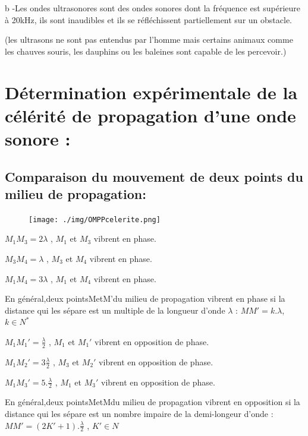 \documentclass[12pt]{article}
\begin{document}
\begin{tcolorbox}
b -Les ondes ultrasonores sont des ondes sonores dont la fréquence est supérieure à 20kHz, ils sont inaudibles et ils se réfléchissent
partiellement sur un obstacle.

(les ultrasons ne sont pas entendus par l’homme mais certains animaux comme les chauves souris, les dauphins ou les baleines
sont capable de les percevoir.)

\end{tcolorbox}

\section{Détermination expérimentale de la célérité de propagation d'une onde sonore : }

\subsection{Comparaison du mouvement de deux points du milieu de propagation: }
\begin{figure}[h]
	\begin{center}
\vspace{-0.5cm}
	\texttt{[image: ./img/OMPPcelerite.png]}
\end{center}
\vspace{-1cm}
\end{figure}

$M_1M_3 = 2\lambda$ , $M_1$ et $M_3$ vibrent en phase.

$M_3M_4 = \lambda$ , $M_3$ et $M_4$ vibrent en phase.

$M_1M_4 = 3\lambda$ , $M_1$ et $M_4$ vibrent en phase.

\begin{tcolorbox}
	En général,deux pointsMetM'du milieu de propagation vibrent en phase si la distance qui les sépare est un multiple de la longueur d'onde $\lambda$ : $MM' = k.\lambda$, $k\in N^*$
\end{tcolorbox}

$M_1M_1' = \frac{\lambda}{2}$ , $M_1$ et $M_1'$ vibrent en opposition de phase.

$M_1M_2' = 3\frac{\lambda}{2}$ , $M_3$ et $M_2'$ vibrent en opposition de phase.

$M_1M_3' = 5.\frac{\lambda}{2}$ , $M_1$ et $M_3'$ vibrent en opposition de phase.

\begin{tcolorbox}
	En général,deux pointsMetMdu milieu de propagation vibrent en opposition si la distance qui les sépare est un nombre impaire de la demi-longeur d'onde : $MM' = (2K' + 1 ).\frac{\lambda}{2}$ , $K' \in N$
\end{tcolorbox}
\end{document}
